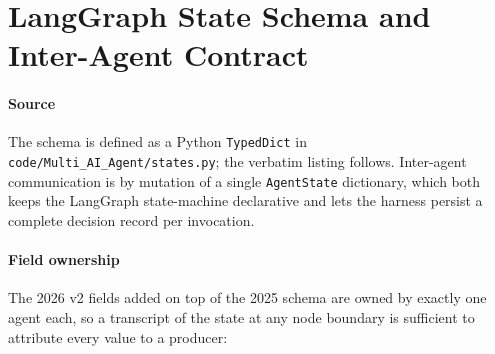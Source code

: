 \section{LangGraph State Schema and Inter-Agent Contract}
\label{sec:appendix-state}
%

\paragraph{Source}
The schema is defined as a Python \texttt{TypedDict} in
\texttt{code/Multi\_AI\_Agent/states.py}; the verbatim listing follows.
Inter-agent communication is by mutation of a single
\texttt{AgentState} dictionary, which both keeps the LangGraph
state-machine declarative and lets the harness persist a complete decision
record per invocation.

\begin{small}

\end{small}

\paragraph{Field ownership}
The 2026 v2 fields added on top of the 2025 schema are owned by exactly
one agent each, so a transcript of the state at any node boundary is
sufficient to attribute every value to a producer:

